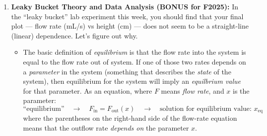 \documentclass[12pt]{article}
\begin{document}
\begin{enumerate}
\begin{enumerate}
	\item Same as previous, but now there is friction between the box and the floor.  The box moves with a constant speed\footnote{Because the box moves with a constant speed, the ``Work-Energy Theorem'' tells us that there must be two works that change the energy of the box: pulling of the person (positive work) and friction from the floor (negative work). These two works sum to make $W_\text{tot} =0$, so $\Delta K = W_\text{tot} = 0$.}.
	\item Heating a pot of boiling water on the stove.  Do it twice: once for ``shortly after you put the pot on the stove'' and once for ``once the water is fully boiling''.
	\item An ice cube melting on a picnic table in the sun.
	\item A situation of your choice that includes an object in energy equilibrium.
	\item A situation of your choice that includes an object not in energy equilibrium.
	\end{enumerate}

\newpage

\item {\bf Leaky Bucket Theory and Data Analysis (BONUS for F2025):}  In the ``leaky bucket'' lab experiment this week, you should find that your final plot --- flow rate (mL/s) vs height (cm) --- does not seem to be a straight-line (linear) dependence.  Let's figure out why.  
	\begin{itemize}
	\item The basic definition of {\em equilibrium} is that the flow rate into the system is equal to the flow rate out of system.  If one of those two rates depends on a {\em parameter} in the system (something that describes the {\em state} of the system), then equilibrium for the system will imply an {\em equilbrium value} for that parameter.   As an equation, where $F$ means {\em flow rate}, and $x$ is the parameter:
	\begin{equation*}
	\text{``equilibrium''} \quad \rightarrow \quad F_\text{in} = F_\text{out}(x) \quad \rightarrow \quad \text{solution for equilibrium value: } x_\text{eq}
	\end{equation*}
where the parentheses on the right-hand side of the flow-rate equation means that the outflow rate {\em depends on} the parameter $x$.


\end{itemize}
\end{enumerate}
\end{document}
